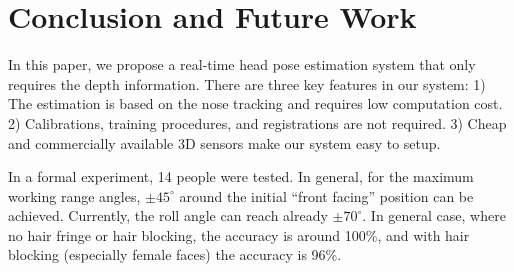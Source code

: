 \section{Conclusion and Future Work}
\label{sec:5}
In this paper, we propose a real-time head pose estimation system that only requires the depth information. There are three key features in our system: 1) The estimation is based on the nose tracking and requires low computation cost. 2) Calibrations, training procedures, and registrations are not required. 3) Cheap and commercially available 3D sensors make our system easy to setup.

In a formal experiment, 14 people were tested. In general, for the maximum working range angles, $\pm 45^{\circ}$ around the initial “front facing” position can be achieved. Currently, the roll angle can reach already $\pm 70^{\circ}$. In general case, where no hair fringe or hair blocking, the accuracy is around 100\%, and with hair blocking (especially female faces) the accuracy is 96\%.






